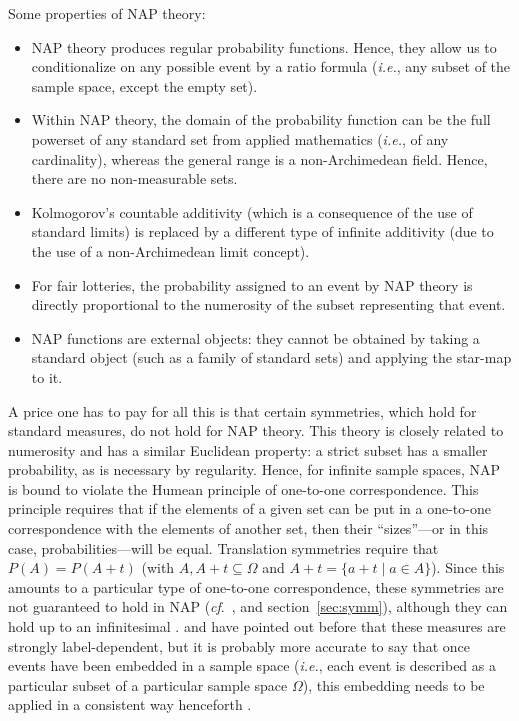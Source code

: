 Some properties of NAP theory:
\begin{itemize}
  \item NAP theory produces regular probability functions. Hence, they allow us to conditionalize on any possible event by a ratio formula (\textit{i.e.}, any subset of the sample space, except the empty set).
  \item Within NAP theory, the domain of the probability function can be the full powerset of any standard set from applied mathematics (\textit{i.e.}, of any cardinality), whereas the general range is a non-Archimedean field. Hence, there are no non-measurable sets.
  \item Kolmogorov's countable additivity (which is a consequence of the use of standard limits) is replaced by a different type of infinite additivity (due to the use of a non-Archimedean limit concept).
  \item For fair lotteries, the probability assigned to an event by NAP theory is directly proportional to the numerosity of the subset representing that event.
  \item NAP functions are external objects: they cannot be obtained by taking a standard object (such as a family of standard sets) and applying the star-map to it.
\end{itemize}

A price one has to pay for all this is that certain symmetries, which hold for standard measures, do not hold for NAP theory. This theory is closely related to numerosity and has a similar Euclidean property: a strict subset has a smaller probability, as is necessary by regularity. Hence, for infinite sample spaces, NAP is bound to violate the Humean principle of one-to-one correspondence. This principle requires that if the elements of a given set can be put in a one-to-one
correspondence with the elements of another set, then their ``sizes''---or in this case, probabilities---will be equal. Translation symmetries require that $P(A)=P(A+t)$ (with $A, A+t \subseteq \Omega$ and $A+t=\{a+t \mid a\in A\}$). Since this amounts to a particular type of one-to-one correspondence, these symmetries are not guaranteed to hold in NAP (\textit{cf}.\ \citet{Williamson:2007,Parker:2013}, and section~\ref{sec:symm}), although they can hold up to an infinitesimal \citep{BernsteinWattenberg:1969}. \citet{Bartha:2004} and \citet{Weintraub:2008} have pointed out before that these measures are strongly label-dependent, but it is probably more accurate to say that once events have been embedded in a sample space (\textit{i.e.}, each event is described as a particular subset of a particular sample space $\Omega$), this embedding needs to be applied in a consistent way henceforth \citep{Hofweber:2014,Benci_etal:2018}.

